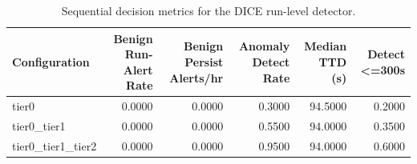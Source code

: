 \begin{table}[t]
\centering
\caption{Sequential decision metrics for the DICE run-level detector.}
\label{tab:dice_sequential_metrics}
\footnotesize
\begin{tabular}{lrrrrr}
\toprule
Configuration & Benign Run-Alert Rate & Benign Persist Alerts/hr & Anomaly Detect Rate & Median TTD (s) & Detect <=300s \\
\midrule
tier0 & 0.0000 & 0.0000 & 0.3000 & 94.5000 & 0.2000 \\
tier0_tier1 & 0.0000 & 0.0000 & 0.5500 & 94.0000 & 0.3500 \\
tier0_tier1_tier2 & 0.0000 & 0.0000 & 0.9500 & 94.0000 & 0.6000 \\
\bottomrule
\end{tabular}

\end{table}
